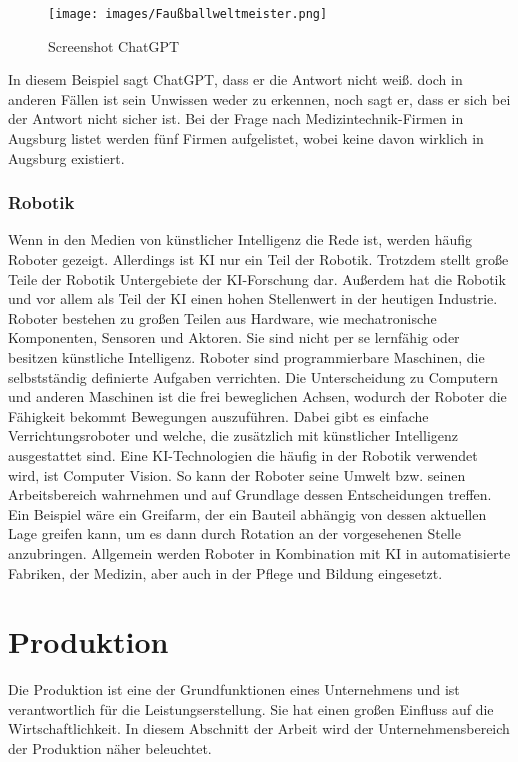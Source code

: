\documentclass[a4paper,12pt, german]{report}
\begin{document}
\begin{figure}[H]
  \center
 \texttt{[image: images/Faußballweltmeister.png]}
  \caption[Screenshot ChatGPT]{Screenshot ChatGPT}
\end{figure}

In diesem Beispiel sagt ChatGPT, dass er die Antwort nicht weiß. doch in anderen Fällen ist sein Unwissen weder zu erkennen, noch sagt er, dass er sich bei der Antwort nicht sicher ist. Bei der Frage nach Medizintechnik-Firmen in Augsburg listet werden fünf Firmen aufgelistet, wobei keine davon wirklich in Augsburg existiert.

\subsubsection{Robotik} 

Wenn in den Medien von künstlicher Intelligenz die Rede ist, werden häufig Roboter gezeigt. Allerdings ist KI nur ein Teil der Robotik. Trotzdem stellt große Teile der Robotik Untergebiete der KI-Forschung dar. Außerdem hat die Robotik und vor allem als Teil der KI einen hohen Stellenwert in der heutigen Industrie.
Roboter bestehen zu großen Teilen aus Hardware, wie mechatronische Komponenten, Sensoren und Aktoren. Sie sind nicht per se lernfähig oder besitzen künstliche Intelligenz. Roboter sind programmierbare Maschinen, die selbstständig definierte Aufgaben verrichten. Die Unterscheidung zu Computern und anderen Maschinen ist die frei beweglichen Achsen, wodurch der Roboter die Fähigkeit bekommt Bewegungen auszuführen. Dabei gibt es einfache Verrichtungsroboter und welche, die zusätzlich mit künstlicher Intelligenz ausgestattet sind. 
Eine KI-Technologien die häufig in der Robotik verwendet wird, ist Computer Vision. So kann der Roboter seine Umwelt bzw. seinen Arbeitsbereich wahrnehmen und auf Grundlage dessen Entscheidungen treffen. Ein Beispiel wäre ein Greifarm, der ein Bauteil abhängig von dessen aktuellen Lage greifen kann, um es dann durch Rotation an der vorgesehenen Stelle anzubringen.
Allgemein werden Roboter in Kombination mit KI in automatisierte Fabriken, der Medizin, aber auch in der Pflege und Bildung eingesetzt. \cite{19}


\section{Produktion}

Die Produktion ist eine der Grundfunktionen eines Unternehmens und ist verantwortlich für die Leistungserstellung. Sie hat einen großen Einfluss auf die Wirtschaftlichkeit. In diesem Abschnitt der Arbeit wird der Unternehmensbereich der Produktion näher beleuchtet.
\end{document}
